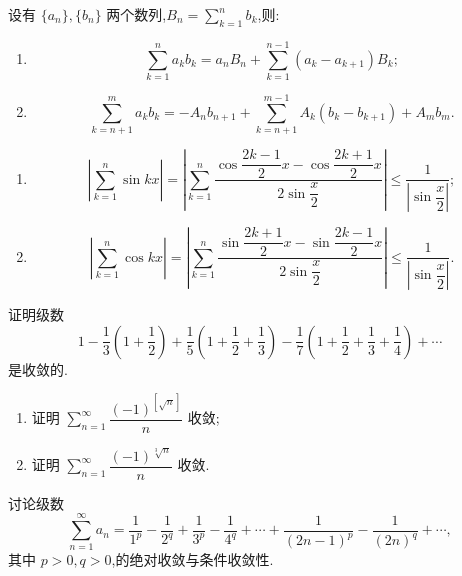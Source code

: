 \documentclass[../../数学分析培优讲义.tex]{subfiles}
\begin{document}
\begin{proposition}
设有 $\{a_n\},\{b_n\}$ 两个数列,$\displaystyle B_n=\sum\limits_{k=1}^nb_k$,则:
\begin{enumerate}[label=(\arabic*)]
    \item
    \[
        \sum\limits_{k=1}^na_kb_k
        =a_nB_n+\sum\limits_{k=1}^{n-1}(a_k-a_{k+1})B_k;
    \]
    \item
    \[
        \sum\limits_{k=n+1}^ma_kb_k
        =-A_nb_{n+1}+\sum\limits_{k=n+1}^{m-1}A_k(b_k-b_{k+1})+A_mb_m.
    \]
\end{enumerate}
\end{proposition}

\begin{proposition}[\markstar]
\begin{enumerate}[label=(\arabic*)]
    \item
    \[
        \left|\sum\limits_{k=1}^n\sin kx\right|
        =\left|\sum\limits_{k=1}^n
        \dfrac{\cos\dfrac{2k-1}{2}x-\cos\dfrac{2k+1}{2}x}{2\sin\dfrac{x}{2}}\right|
        \leq\dfrac{1}{|\sin\dfrac{x}{2}|};
    \]
    \item
    \[
        \left|\sum\limits_{k=1}^n\cos kx\right|
        =\left|\sum\limits_{k=1}^n
        \dfrac{\sin\dfrac{2k+1}{2}x-\sin\dfrac{2k-1}{2}x}{2\sin\dfrac{x}{2}}\right|
        \leq\dfrac{1}{|\sin\dfrac{x}{2}|}.
    \]
\end{enumerate}
\end{proposition}

\begin{example}
证明级数
\[
    1-\dfrac{1}{3}\left(1+\dfrac{1}{2}\right)
    +\dfrac{1}{5}\left(1+\dfrac{1}{2}+\dfrac{1}{3}\right)
    -\dfrac{1}{7}\left(1+\dfrac{1}{2}+\dfrac{1}{3}+\dfrac{1}{4}\right)+\cdots
\]
是收敛的.
\end{example}
\exampleblank

\begin{example}[\markstar]
\begin{enumerate}[label=(\arabic*)]
    \item 证明 $\displaystyle\sum\limits_{n=1}^{\infty}\dfrac{(-1)^{[\sqrt n]}}{n}$ 收敛;
    \item 证明 $\displaystyle\sum\limits_{n=1}^{\infty}\dfrac{(-1)^{\sqrt[3]{n}}}{n}$ 收敛.
\end{enumerate}
\end{example}
\exampleblank

\begin{example}
讨论级数
\[
    \sum\limits_{n=1}^{\infty}a_n
    =\dfrac{1}{1^p}-\dfrac{1}{2^q}+\dfrac{1}{3^p}-\dfrac{1}{4^q}+
    \cdots+\dfrac{1}{(2n-1)^p}-\dfrac{1}{(2n)^q}+\cdots,
\]
其中 $p>0,q>0$,的绝对收敛与条件收敛性.
\end{example}
\exampleblank
\end{document}
